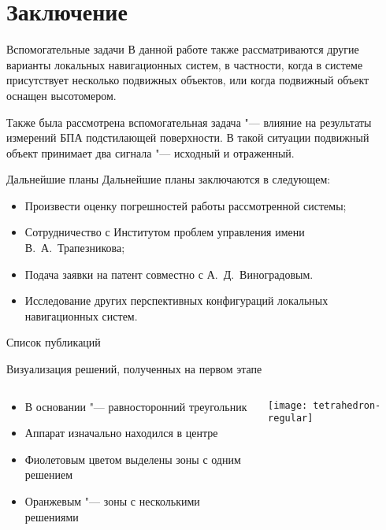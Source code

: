 \documentclass[russian,hyperref={unicode}]{beamer}
\begin{document}
  \section{Заключение}

  \begin{frame}{Вспомогательные задачи}
    В данной работе также рассматриваются другие варианты локальных навигационных систем, в частности, когда в системе присутствует несколько подвижных объектов, или когда подвижный объект оснащен высотомером.

    Также была рассмотрена вспомогательная задача "--- влияние на результаты измерений БПА подстилающей поверхности. В такой ситуации подвижный объект принимает два сигнала "--- исходный и отраженный.
  \end{frame}

  \begin{frame}{Дальнейшие планы}
    Дальнейшие планы заключаются в следующем:
    \begin{itemize}
      \item Произвести оценку погрешностей работы рассмотренной системы;
      \item Сотрудничество с Институтом проблем управления имени В.~А.~Трапезникова;
      \item Подача заявки на патент совместно с А.~Д.~Виноградовым.
      \item Исследование других перспективных конфигураций локальных навигационных систем.
    \end{itemize}
  \end{frame}

  \begin{frame}[allowframebreaks]{Список публикаций}
    \printbibliography
  \end{frame}

  \frame{\titlepage}

  \appendix
  \begin{frame}{Визуализация решений, полученных на первом этапе}
    \begin{columns}[c]
      \begin{column}{.5\textwidth}
        \begin{itemize}
          \item В основании "--- равносторонний треугольник
          \item Аппарат изначально находился в центре
          \item Фиолетовым цветом выделены зоны с одним решением
          \item Оранжевым "--- зоны с несколькими решениями
        \end{itemize}
      \end{column}
      \begin{column}{.5\textwidth}
        \begin{center}
          \texttt{[image: tetrahedron-regular]}
        \end{center}
      \end{column}
    \end{columns}
  \end{frame}
\end{document}

